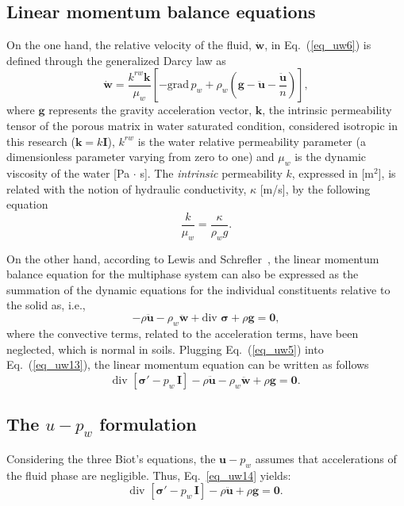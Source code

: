 \documentclass[twocolumn]{svjour3}          %
\begin{document}
\subsection{Linear momentum balance equations}
\label{subsec:22}
On the one hand, the relative velocity of the fluid, %
   $\dot{\boldsymbol{w}}$, in Eq.~(\ref{eq_uw6})  is defined through the generalized Darcy law as~\cite{LewisSchrefler98}
\begin{equation}\label{eq_uw8}
\dot{\boldsymbol{w}}=\frac{k^{rw}\boldsymbol{k}}{\mu_w}\left[ -\mbox{grad} \,p_w + \rho_w(\boldsymbol{g}-\ddot{\boldsymbol{u}}-\frac{\ddot{\boldsymbol{u}}}{n})\right] ,
\end{equation}
where $\boldsymbol{g}$ represents the gravity acceleration vector,  $\boldsymbol{k}$, the intrinsic permeability tensor of the porous matrix in water saturated condition, considered isotropic in this research ($\boldsymbol{k}=k \boldsymbol{I}$), $k^{rw}$ is the water relative permeability parameter (a dimensionless parameter varying from zero to one) and $\mu_w$ is the dynamic viscosity of the water [Pa $\cdot$ s].  The {\it intrinsic}  permeability $k$, expressed in  [m$^{2}$], is related with the  notion of  hydraulic conductivity,  $\kappa$ [m/s],  by the following equation
\begin{equation}\label{eq_uw9}
\frac{k}{\mu_w}=\frac{\kappa}{\rho_w g}.
\end{equation}

On the other hand, according to Lewis and Schrefler~\cite{LewisSchrefler98},   the linear momentum balance equation for the multiphase system  can also be expressed as the summation of the dynamic equations for the individual constituents relative to the solid as, i.e.,
\begin{equation}\label{eq_uw13}
-\rho\ddot{\boldsymbol{u}} - \rho_w\ddot{\boldsymbol{w}} + \mbox{div } \boldsymbol{\sigma}+\rho\boldsymbol{g}=\boldsymbol{0},
\end{equation}
where the convective terms, related to the acceleration terms, have been neglected, which is normal in soils. Plugging Eq.~(\ref{eq_uw5}) into Eq.~(\ref{eq_uw13}), the linear momentum equation can be written as follows
\begin{equation}\label{eq_uw14}
\mbox{div }\left[ \boldsymbol{ \sigma'} - p_{w} \, \textbf{I} \right]-\rho\boldsymbol{\ddot{u}}-\rho_w\boldsymbol{\ddot{w}}+\rho\boldsymbol{g}=\boldsymbol{0}.
\end{equation}
\subsection{The $u-p_w$ formulation}
\label{subsec:23}
Considering the three Biot's equations, the $\boldsymbol{u}-p_w$ assumes that accelerations of the fluid phase are negligible. Thus, Eq.~\eqref{eq_uw14} yields:
\begin{equation}\label{eq_uw15}
\mbox{div }\left[ \boldsymbol{ \sigma'} - p_{w} \, \textbf{I} \right]-\rho\boldsymbol{\ddot{u}}+\rho\boldsymbol{g}=\boldsymbol{0}.
\end{equation}
\end{document}
